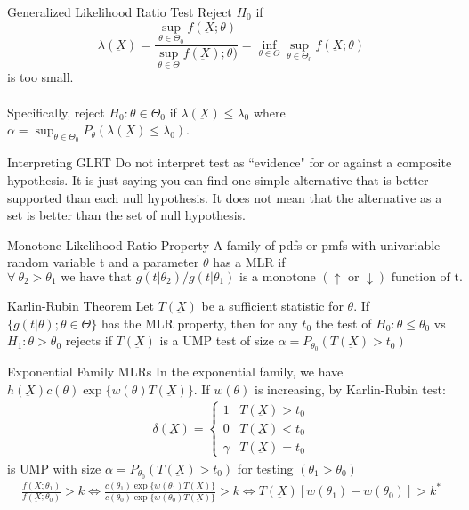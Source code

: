 \documentclass[avery5388,grid,frame]{flashcards}
\begin{document}
\begin{flashcard}[Definition]{Generalized Likelihood Ratio Test}
\bigskip\bigskip\bigskip
Reject $H_0$ if\\
\begin{equation*}
\lambda(\underbar{X})=\frac{\sup_{\theta\in\Theta_0}f(\underbar{X};\theta)}{\sup_{\theta\in\Theta}f(\underbar{X});\theta)}=\inf_{\theta\in\Theta}\sup_{\theta\in\Theta_0}f(\underbar{X};\theta)
\end{equation*}
is too small.\\\\Specifically, reject $H_0:\theta\in\Theta_0$ if $\lambda(\underbar{X})\leq\lambda_0$ where $\alpha=\sup_{\theta\in\Theta_0}P_\theta(\lambda(\underbar{X})\leq\lambda_0)$.
\end{flashcard}
\begin{flashcard}{Interpreting GLRT}
\bigskip\bigskip\bigskip
Do not interpret test as ``evidence" for or against a composite hypothesis. It is just saying you can find one simple alternative that is better supported than each null hypothesis. It does not mean that the alternative as a set is better than the set of null hypothesis.
\end{flashcard}
\begin{flashcard}[Definition]{Monotone Likelihood Ratio Property}
\bigskip\bigskip\bigskip
A family of pdfs or pmfs with univariable random variable t and a parameter $\theta$ has a MLR if 
\begin{equation*}
\forall\:\theta_2>\theta_1\textrm{ we have that } g(t|\theta_2)/g(t|\theta_1) \textrm{ is a monotone }(\uparrow\textrm{ or }\downarrow) \textrm{ function of t.}
\end{equation*}
\end{flashcard}
\begin{flashcard}[Definition]{Karlin-Rubin Theorem}
\bigskip\bigskip\bigskip
Let $T(\underbar{X})$ be a sufficient statistic for $\theta$. If $\{g(t|\theta);\theta\in\Theta\}$ has the MLR property, then for any $t_0$ the test of $H_0:\theta\leq\theta_0$ vs $H_1:\theta>\theta_0$ rejects if $T(\underbar{X})$ is a UMP test of size $\alpha=P_{\theta_0}(T(\underbar{X})>t_0)$
\end{flashcard}
\begin{flashcard}{Exponential Family MLRs}
\bigskip
In the exponential family, we have $h(\underbar{X})c(\theta)\exp\{w(\theta)T(\underbar{X})\}$. If $w(\theta)$ is increasing, by Karlin-Rubin test:
{\begin{align*}
\delta(\underbar{X})=\begin{cases}
1&T(\underbar{X})>t_0\\
0&T(\underbar{X})<t_0\\
\gamma&T(\underbar{X})=t_0
\end{cases}
\end{align*}}
is UMP with size $\alpha=P_{\theta_0}(T(\underbar{X})>t_0)$ for testing $(\theta_1>\theta_0)$
{\begin{align*}
\frac{f(\underbar{X};\theta_1)}{f(\underbar{X};\theta_0)}>k\iff\frac{c(\theta_1)\exp\{w(\theta_1)T(\underbar{X})\}}{c(\theta_0)\exp\{w(\theta_0)T(\underbar{X})\}}>k\iff T(\underbar{X})[w(\theta_1)-w(\theta_0)]>k^*
\end{align*}}
\end{flashcard}
\end{document}
